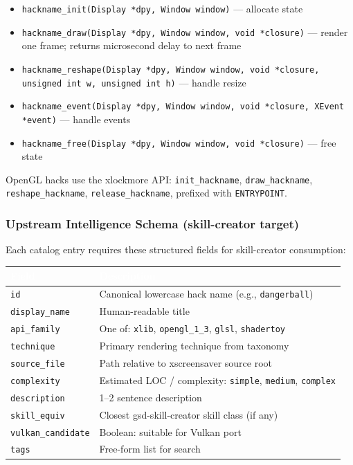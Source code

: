 \documentclass[11pt,letterpaper]{article}
\newcommand{\tableheader}[1]{\textbf{\sffamily\textcolor{white}{#1}}}
\begin{document}
\begin{itemize}
\item \texttt{hackname\_init(Display *dpy, Window window)} --- allocate state
\item \texttt{hackname\_draw(Display *dpy, Window window, void *closure)} --- render one frame; returns microsecond delay to next frame
\item \texttt{hackname\_reshape(Display *dpy, Window window, void *closure, unsigned int w, unsigned int h)} --- handle resize
\item \texttt{hackname\_event(Display *dpy, Window window, void *closure, XEvent *event)} --- handle events
\item \texttt{hackname\_free(Display *dpy, Window window, void *closure)} --- free state
\end{itemize}

OpenGL hacks use the xlockmore API: \texttt{init\_hackname}, \texttt{draw\_hackname}, \texttt{reshape\_hackname}, \texttt{release\_hackname}, prefixed with \texttt{ENTRYPOINT}.

\subsubsection{Upstream Intelligence Schema (skill-creator target)}

Each catalog entry requires these structured fields for skill-creator consumption:

\begin{center}
\begin{tabularx}{\textwidth}{L{3cm}X}
\toprule
{}
\tableheader{Field} & \tableheader{Description} \\
\midrule
\texttt{id} & Canonical lowercase hack name (e.g., \texttt{dangerball}) \\
\texttt{display\_name} & Human-readable title \\
\texttt{api\_family} & One of: \texttt{xlib}, \texttt{opengl\_1\_3}, \texttt{glsl}, \texttt{shadertoy} \\
\texttt{technique} & Primary rendering technique from taxonomy \\
\texttt{source\_file} & Path relative to xscreensaver source root \\
\texttt{complexity} & Estimated LOC / complexity: \texttt{simple}, \texttt{medium}, \texttt{complex} \\
\texttt{description} & 1--2 sentence description \\
\texttt{skill\_equiv} & Closest gsd-skill-creator skill class (if any) \\
\texttt{vulkan\_candidate} & Boolean: suitable for Vulkan port \\
\texttt{tags} & Free-form list for search \\
\bottomrule
\end{tabularx}
\end{center}
\end{document}
